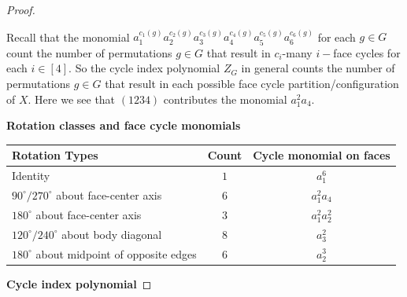 \documentclass[addpoints,10pt]{exam}
\theoremstyle{plain}
\theoremstyle{definition}
\theoremstyle{plain}
\theoremstyle{plain}
\theoremstyle{definition}
\begin{document}
\begin{proof}
\begin{center}
\end{center}

Recall that the monomial $a_{1}^{c_{1}(g)}a_{2}^{c_{2}(g)}a_{3}^{c_{3}(g)}a_{4}^{c_{4}(g)}a_{5}^{c_{5}(g)}a_{6}^{c_{6}(g)}$ for each $g\in G$ count the number of permutations $g\in G$ that result in $c_{i}$-many $i-$face cycles for each $i\in [4]$. So the cycle index polynomial $Z_{G}$ in general counts the number of permutations $g\in G$ that result in each possible face cycle partition/configuration of $X$. Here we see that $(1234)$ contributes the monomial $a_{1}^{2}a_{4}$.

\medskip
\noindent
\textbf{Rotation classes and face cycle monomials}

\begingroup
\def\arraystretch{1.1}
\begin{center}
\begin{tabular}{l|c|c}
\textbf{Rotation Types} & \textbf{Count} & \textbf{Cycle monomial on faces} \\
\hline
Identity & $1$ & $a_1^6$ \\
\hline
$90^\circ/270^\circ$ about face-center axis & $6$ & $a_1^2 a_4$ \\
\hline
$180^\circ$ about face-center axis & $3$ & $a_1^2 a_2^2$ \\
\hline
$120^\circ/240^\circ$ about body diagonal & $8$ & $a_3^2$ \\
\hline
$180^\circ$ about midpoint of opposite edges & $6$ & $a_2^3$ \\
\end{tabular}
\end{center}
\endgroup
\textbf{Cycle index polynomial}


\end{proof}
\end{document}
